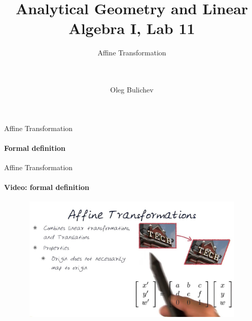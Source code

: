 \documentclass[aspectratio=169]{beamer}
\title[AGLA1]{Analytical Geometry and Linear Algebra I, Lab 11} %
\subtitle{Affine Transformation
\\ \   \\ \ 
         } %
\author{Oleg Bulichev}
\newcommand{\fbckg}[1]{\usebackgroundtemplate{\texttt{[image: \#1]}}}%
\begin{document}
\setlength{\abovedisplayskip}{0pt}
\setlength{\belowdisplayskip}{0pt}
\setlength{\abovedisplayshortskip}{0pt}
\setlength{\belowdisplayshortskip}{0pt}

\fbckg{fibeamer/figs/title_page.png}

\fbckg{fibeamer/figs/common.png}


\begin{frame}[t]{Affine Transformation}
\framesubtitle{Formal definition}
    
\end{frame}

\begin{frame}[t]{Affine Transformation}
    \framesubtitle{Video: formal definition}
    \vspace{-0.6cm}
    \begin{figure}[H]
        \href{https://www.youtube.com/watch?v=il6Z5LCykZk}{
            \centering\includegraphics[height=6cm,width=1\textwidth,keepaspectratio]{formal_def.jpg}}
        \label{fig:formal_def.jpg}
    \end{figure}
\end{frame}
\end{document}
